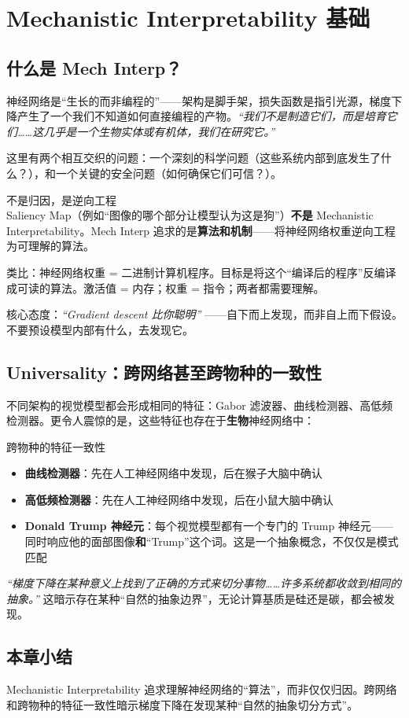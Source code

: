 \section{Mechanistic Interpretability 基础}

\subsection{什么是 Mech Interp？}

神经网络是``生长的而非编程的''——架构是脚手架，损失函数是指引光源，梯度下降产生了一个我们不知道如何直接编程的产物。\textit{``我们不是制造它们，而是培育它们……这几乎是一个生物实体或有机体，我们在研究它。''}

这里有两个相互交织的问题：一个深刻的科学问题（这些系统内部到底发生了什么？），和一个关键的安全问题（如何确保它们可信？）。

\begin{importantbox}{不是归因，是逆向工程}
Saliency Map（例如``图像的哪个部分让模型认为这是狗''）\textbf{不是} Mechanistic Interpretability。Mech Interp 追求的是\textbf{算法和机制}——将神经网络权重逆向工程为可理解的算法。

类比：神经网络权重 = 二进制计算机程序。目标是将这个``编译后的程序''反编译成可读的算法。激活值 = 内存；权重 = 指令；两者都需要理解。

核心态度：\textit{``Gradient descent 比你聪明''} ——自下而上发现，而非自上而下假设。不要预设模型内部有什么，去发现它。
\end{importantbox}

\subsection{Universality：跨网络甚至跨物种的一致性}

不同架构的视觉模型都会形成相同的特征：Gabor 滤波器、曲线检测器、高低频检测器。更令人震惊的是，这些特征也存在于\textbf{生物}神经网络中：

\begin{knowledgebox}{跨物种的特征一致性}
\begin{itemize}
    \item \textbf{曲线检测器}：先在人工神经网络中发现，后在猴子大脑中确认
    \item \textbf{高低频检测器}：先在人工神经网络中发现，后在小鼠大脑中确认
    \item \textbf{Donald Trump 神经元}：每个视觉模型都有一个专门的 Trump 神经元——同时响应他的面部图像\textbf{和}``Trump''这个词。这是一个抽象概念，不仅仅是模式匹配
\end{itemize}

\textit{``梯度下降在某种意义上找到了正确的方式来切分事物……许多系统都收敛到相同的抽象。''} 这暗示存在某种``自然的抽象边界''，无论计算基质是硅还是碳，都会被发现。
\end{knowledgebox}

\subsection{本章小结}

Mechanistic Interpretability 追求理解神经网络的``算法''，而非仅仅归因。跨网络和跨物种的特征一致性暗示梯度下降在发现某种``自然的抽象切分方式''。

